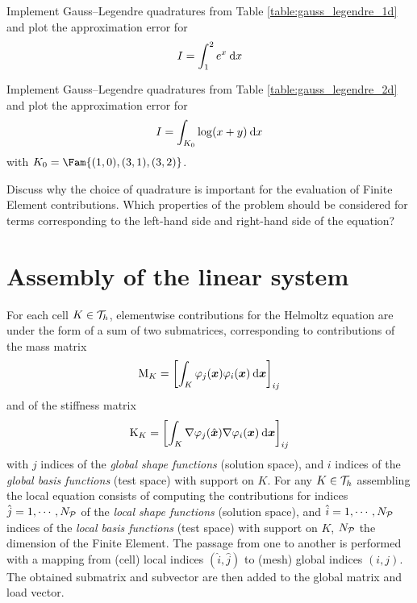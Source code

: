 \documentclass[assignment]{tmanotes}
\begin{document}

\medskip
\begin{tmatsks}
\item Implement Gauss--Legendre quadratures from Table \ref{table:gauss_legendre_1d} and plot the approximation error for
\[
I = \int_1^2 e^x \hspace{.5ex}{\mathrm d} x
\]
\item Implement Gauss--Legendre quadratures from Table \ref{table:gauss_legendre_2d} and plot the approximation error for
\[
I = \int_{K_0} \log(x+y) \hspace{.5ex}{\mathrm d} x
\]
with $K_0 = \Fam{ (1,0), (3,1), (3,2)}$.
\item Discuss why the choice of quadrature is important for the evaluation of Finite Element contributions. Which properties of the problem should be considered for terms corresponding to the left-hand side and right-hand side of the equation?
\end{tmatsks}

\section{Assembly of the linear system}

For each cell $K \in {\mathcal T}_h$, elementwise contributions for the Helmoltz equation are under the form of a sum of two submatrices, corresponding to contributions of the mass matrix
\[
{\mathrm M}_K =  \left[\int_K \varphi_j({{\boldsymbol x}}) \varphi_i({{\boldsymbol x}}) \hspace{.5ex}{\mathrm d}{{\boldsymbol x}}\right]_{i j}
\]
and of the stiffness matrix
\[
{\mathrm K}_K = \left[\int_K \nabla\varphi_j(\hat{{\boldsymbol x}}) \nabla\varphi_i({{\boldsymbol x}}) \hspace{.5ex}{\mathrm d}{{\boldsymbol x}}\right]_{ij}
\]
with $j$ indices of the \textit{global shape functions} (solution space), and $i$ indices of the \textit{global basis functions} (test space) with support on $K$.
For any $K\in{\mathcal T}_h$ assembling the local equation consists of computing the contributions for indices $\hat j = 1,\cdots,N_{\mathcal P}$  of the \textit{local shape functions} (solution space), and $\hat i = 1,\cdots,N_{\mathcal P}$ indices of the \textit{local basis functions} (test space) with support on $K$, $N_{\mathcal P}$ the dimension of the Finite Element.
The passage from one to another is performed with a mapping from (cell) local indices $(\hat i, \hat j)$ to (mesh) global indices $(i, j)$.
The obtained submatrix and subvector are then added to the global matrix and load vector.
\end{document}

